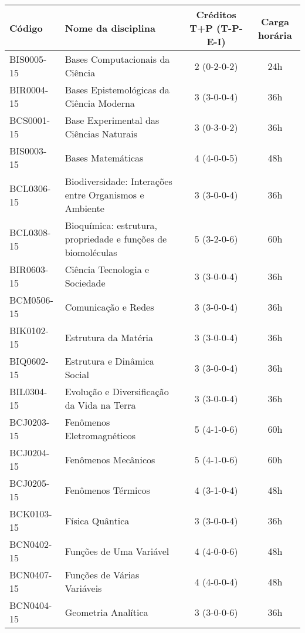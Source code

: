 \begin{table}[h!]
    \centering
    \begin{tabular}{|l|p{}|c|c|}
        \hline
        \textbf{Código} & \textbf{Nome da disciplina} & \textbf{Créditos T+P (T-P-E-I)} & \textbf{Carga horária}\\
        \hline\hline
        BIS0005-15 & Bases Computacionais da Ciência & 2 (0-2-0-2) & 24h\\
        \hline
        BIR0004-15 & Bases Epistemológicas da Ciência Moderna & 3 (3-0-0-4) & 36h\\
        \hline
        BCS0001-15 & Base Experimental das Ciências Naturais & 3 (0-3-0-2) & 36h\\
        \hline
        BIS0003-15 & Bases Matemáticas & 4 (4-0-0-5) & 48h\\
        \hline
        BCL0306-15 & Biodiversidade: Interações entre Organismos e Ambiente & 3 (3-0-0-4) & 36h\\
        \hline
        BCL0308-15 & Bioquímica: estrutura, propriedade e funções de biomoléculas & 5 (3-2-0-6) & 60h\\
        \hline
        BIR0603-15 & Ciência Tecnologia e Sociedade & 3 (3-0-0-4) & 36h\\
        \hline
        BCM0506-15 & Comunicação e Redes & 3 (3-0-0-4) & 36h\\
        \hline
        BIK0102-15 & Estrutura da Matéria & 3 (3-0-0-4) & 36h\\
        \hline
        BIQ0602-15 & Estrutura e Dinâmica Social & 3 (3-0-0-4) & 36h \\
        \hline
        BIL0304-15 & Evolução e Diversificação da Vida na Terra & 3 (3-0-0-4) & 36h\\
        \hline
        BCJ0203-15 & Fenômenos Eletromagnéticos & 5 (4-1-0-6) & 60h\\
        \hline
        BCJ0204-15 & Fenômenos Mecânicos & 5 (4-1-0-6) & 60h \\
        \hline
        BCJ0205-15 & Fenômenos Térmicos & 4 (3-1-0-4) & 48h\\
        \hline
        BCK0103-15 & Física Quântica & 3 (3-0-0-4) & 36h\\
        \hline
        BCN0402-15 & Funções de Uma Variável & 4 (4-0-0-6) & 48h\\
        \hline
        BCN0407-15 & Funções de Várias Variáveis & 4 (4-0-0-4) & 48h \\
        \hline
        BCN0404-15 & Geometria Analítica & 3 (3-0-0-6) & 36h\\
        \hline

\end{tabular}
\end{table}
